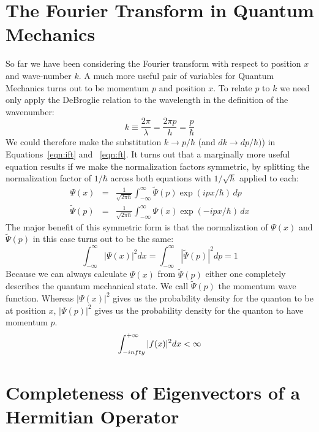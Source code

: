 \documentclass[12pt]{book}
\begin{document}
\section{The Fourier Transform in Quantum Mechanics}

So far we have been considering the Fourier transform with respect to position $x$ and wave-number $k$.  A much more useful pair of variables for Quantum Mechanics turns out to be momentum $p$ and position $x$.  To relate $p$ to $k$ we need only apply the DeBroglie relation to the wavelength in the definition of the wavenumber:
\begin{displaymath}
k \equiv \frac{2 \pi}{\lambda} = \frac{2 \pi p}{h} = \frac{p}{\hbar}
\end{displaymath}
We could therefore make the substitution $k \to p/\hbar$ (and $dk \to dp / \hbar)$) in Equations~\ref{eqn:ift} and ~\ref{eqn:ft}.  It turns out that a marginally more useful equation results if we make the normalization factors symmetric, by splitting the normalization factor of $1/\hbar$ across both equations with $1/\sqrt{\hbar}$ applied to each:
\begin{eqnarray} 
\Psi(x) &=& \frac{1}{\sqrt{2\pi\hbar}} \int_{-\infty}^{\infty} \widetilde{\Psi}(p) \exp(ipx/\hbar) \, dp \\
\widetilde{\Psi}(p) &=&  \frac{1}{\sqrt{2\pi\hbar}} \int_{-\infty}^{\infty} {\Psi}(x) \exp(-ipx/\hbar) \, dx
\end{eqnarray}
The major benefit of this symmetric form is that the normalization of $\Psi(x)$ and $\widetilde{\Psi}(p)$ in this case turns out to be the same:
\begin{displaymath}
\int_{-\infty}^{\infty} |\Psi(x)|^2 dx = \int_{-\infty}^{\infty} |\widetilde{\Psi}(p)|^2 dp = 1 
\end{displaymath}
Because we can always calculate $\Psi(x)$ from $\widetilde{\Psi}(p)$ either one completely describes the quantum mechanical state.  We call $\widetilde{\Psi}(p)$ the momentum wave function.   Whereas $|\Psi(x)|^2$ gives us the probability density for the quanton to be at position $x$, $|\Psi(p)|^2$ gives us the probability density for the quanton to have momentum $p$.
$$\int_{-\\infty}^{+\infty} |f(x)|^2 dx < \infty$$


\section{Completeness of Eigenvectors of a Hermitian Operator}
\end{document}
